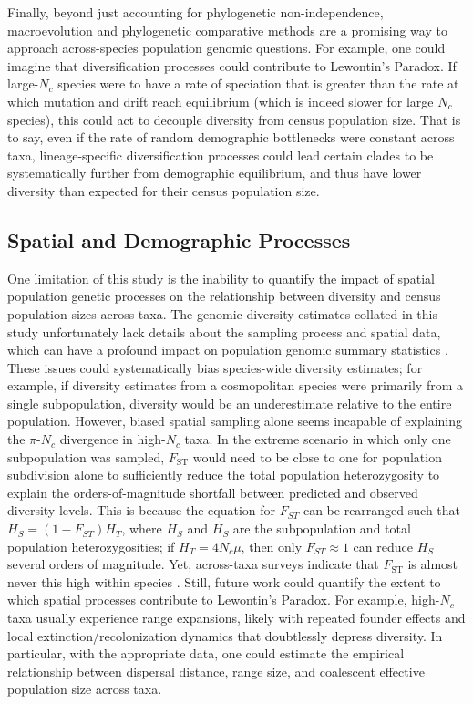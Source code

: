 \documentclass[9pt,lineno]{elife}
\begin{document}
Finally, beyond just accounting for phylogenetic non-independence,
macroevolution and phylogenetic comparative methods are a promising way to
approach across-species population genomic questions. For example, one could
imagine that diversification processes could contribute to Lewontin's Paradox.
If large-$N_c$ species were to have a rate of speciation that is greater than
the rate at which mutation and drift reach equilibrium (which is indeed slower
for large $N_c$ species), this could act to decouple diversity from census
population size. That is to say, even if the rate of random demographic
bottlenecks were constant across taxa, lineage-specific diversification
processes could lead certain clades to be systematically further from
demographic equilibrium, and thus have lower diversity than expected for their
census population size. 

\subsection{Spatial and Demographic Processes}

One limitation of this study is the inability to quantify the impact of spatial
population genetic processes on the relationship between diversity and census
population sizes across taxa. The genomic diversity estimates collated in this
study unfortunately lack details about the sampling process and spatial data,
which can have a profound impact on population genomic summary statistics
\citep{Battey2020-lc}. These issues could systematically bias species-wide
diversity estimates; for example, if diversity estimates from a cosmopolitan
species were primarily from a single subpopulation, diversity would be an
underestimate relative to the entire population. However, biased spatial
sampling alone seems incapable of explaining the $\pi$-$N_c$ divergence in
high-$N_c$ taxa. In the extreme scenario in which only one subpopulation was
sampled, $F_\text{ST}$ would need to be close to one for population subdivision
alone to sufficiently reduce the total population heterozygosity to explain the
orders-of-magnitude shortfall between predicted and observed diversity levels.
This is because the equation for $F_{ST}$ can be rearranged such that $H_S =
(1-F_{ST})H_T$, where $H_S$ and $H_S$ are the subpopulation and total
population heterozygosities; if $H_T = 4N_c\mu$, then only $F_{ST} \approx 1$
can reduce $H_S$ several orders of magnitude. Yet, across-taxa surveys indicate
that $F_\text{ST}$ is almost never this high within species
\citep{Roux2016-lm}.  Still, future work could quantify the extent to which
spatial processes contribute to Lewontin's Paradox. For example, high-$N_c$
taxa usually experience range expansions, likely with repeated founder effects
and local extinction/recolonization dynamics that doubtlessly depress
diversity. In particular, with the appropriate data, one could estimate the
empirical relationship between dispersal distance, range size, and coalescent
effective population size across taxa.
\end{document}
